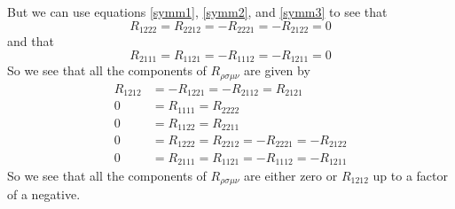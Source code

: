 \documentclass[11pt]{article}
\numberwithin{equation}{section}
\begin{document}
\begin{enumerate}[(a)]
But we can use equations \ref{symm1}, \ref{symm2}, and \ref{symm3} to see that
$$R_{1222} = R_{2212} = -R_{2221} = -R_{2122} = 0$$
and that
$$R_{2111} = R_{1121} = -R_{1112} = -R_{1211} = 0$$
So we see that all the components of $R_{\rho\sigma\mu\nu}$ are given by
\begin{align*}
R_{1212} &= - R_{1221} = -R_{2112} = R_{2121}\\
0 &= R_{1111} = R_{2222}\\
0 &= R_{1122} = R_{2211}\\
0 &= R_{1222} = R_{2212} = -R_{2221} = -R_{2122}\\
0 &= R_{2111} = R_{1121} = -R_{1112} = -R_{1211}
\end{align*}
So we see that all the components of $R_{\rho\sigma\mu\nu}$ are either zero or $R_{1212}$ up to a factor of a negative.


\end{enumerate}
\end{document}
